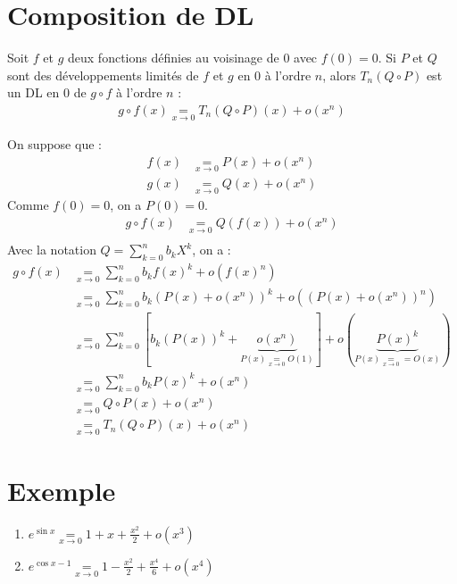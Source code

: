 \documentclass[../main.tex]{subfiles}
\begin{document}
\section{Composition de DL}
\begin{tcolorbox}[title=Propostion 25.59, title filled=false, colframe=lightblue, colback=lightblue!10!white]
    Soit $f$ et $g$ deux fonctions définies au voisinage de $0$ avec $f(0) = 0$. Si $P$ et $Q$ sont des développements limités de $f$ et $g$ en $0$ à l'ordre $n$, alors $T_n(Q\circ P)$ est un DL en $0$ de $g\circ f$ à l'ordre $n$ : 
    \begin{align*}
        g \circ f(x) \underset{x\to 0}{=} T_n(Q\circ P)(x) + o(x^n)
    \end{align*}
\end{tcolorbox}

\noindent On suppose que : 
\begin{align*}
    f(x) &\underset{x\to 0}{=} P(x) + o(x^n) \\
    g(x) &\underset{x\to 0}{=} Q(x) + o(x^n)
\end{align*}
Comme $f(0) = 0$, on a $P(0) = 0$. \\
\begin{align*}
    g \circ f(x) &\underset{x\to 0}{=} Q(f(x)) + o(x^n) \\
\end{align*}
Avec la notation $Q = \sum\limits_{k=0}^{n} b_k X^k$, on a :
\begin{align*}
    g\circ f(x) &\underset{x\to 0}{=} \sum_{k=0}^{n} b_k f(x)^k + o(f(x)^n) \\
    &\underset{x\to 0}{=} \sum_{k=0}^{n} b_k (P(x) + o(x^n))^k + o((P(x) + o(x^n))^n) \\
    &\underset{x\to 0}{=} \sum_{k=0}^{n} [b_k (P(x))^k + \underbrace{o(x^n)}_{P(x) \underset{x\to 0}{=} O(1)}] + o(\underbrace{P(x)^k}_{P(x) \underset{x\to 0}{=} = O(x)}) \\
    &\underset{x\to 0}{=} \sum_{k=0}^{n} b_k P(x)^k + o(x^n) \\
    &\underset{x\to 0}{=} Q\circ P(x) + o(x^n) \\
    &\underset{x\to 0}{=} T_n(Q\circ P)(x) + o(x^n)
\end{align*}

\section{Exemple}
\begin{tcolorbox}[title=Exemple 25.59, title filled=false, colframe=darkgreen, colback=darkgreen!10!white]
    \begin{enumerate}
        \item $e^{\sin x} \underset{x\to 0}{=} 1 + x + \frac{x^2}{2} + o(x^3)$
        \item $e^{\cos x - 1} \underset{x\to 0}{=} 1 - \frac{x^2}{2} + \frac{x^4}{6} + o(x^4)$
    \end{enumerate}
\end{tcolorbox}
\end{document}
